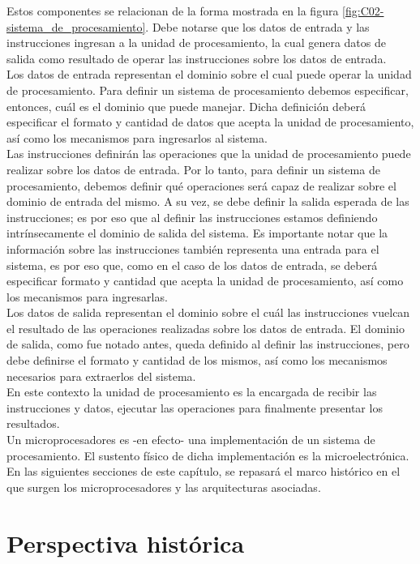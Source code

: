 Estos componentes se relacionan de la forma mostrada en la figura \ref{fig:C02-sistema_de_procesamiento}. Debe notarse que los datos de entrada y las instrucciones ingresan a la unidad de procesamiento, la cual genera datos de salida como resultado de operar las instrucciones sobre los datos de entrada.\\
Los datos de entrada representan el dominio sobre el cual puede operar la unidad de procesamiento. Para definir un sistema de procesamiento debemos especificar, entonces, cuál es el dominio que puede manejar. Dicha definición deberá especificar el formato y cantidad de datos que acepta la unidad de procesamiento, así como los mecanismos para ingresarlos al sistema.\\
Las instrucciones definirán las operaciones que la unidad de procesamiento puede realizar sobre los datos de entrada. Por lo tanto, para definir un sistema de procesamiento, debemos definir qué operaciones será capaz de realizar sobre el dominio de entrada del mismo. A su vez, se debe definir la salida esperada de las instrucciones; es por eso que al definir las instrucciones estamos definiendo intrínsecamente el dominio de salida del sistema. Es importante notar que la información sobre las instrucciones también representa una entrada para el sistema, es por eso que, como en el caso de los datos de entrada, se deberá especificar formato y cantidad que acepta la unidad de procesamiento, así como los mecanismos para ingresarlas.\\
Los datos de salida representan el dominio sobre el cuál las instrucciones vuelcan el resultado de las operaciones realizadas sobre los datos de entrada. El dominio de salida, como fue notado antes, queda definido al definir las instrucciones, pero debe definirse el formato y cantidad de los mismos, así como los mecanismos necesarios para extraerlos del sistema.\\
En este contexto la unidad de procesamiento es la encargada de recibir las instrucciones y datos, ejecutar las operaciones para finalmente presentar los resultados.\\
Un microprocesadores es -en efecto- una implementación de un sistema de procesamiento. El sustento físico de dicha implementación es la microelectrónica. En las siguientes secciones de este capítulo, se repasará el marco histórico en el que surgen los microprocesadores y las arquitecturas asociadas.

\section{Perspectiva histórica}

